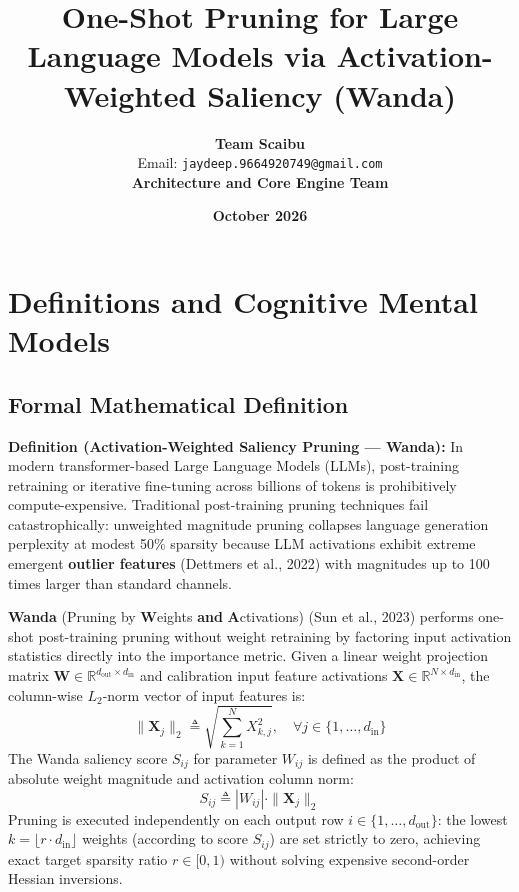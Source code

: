 \documentclass[11pt,a4paper]{article}
\title{\textbf{One-Shot Pruning for Large Language Models via Activation-Weighted Saliency (Wanda)}}
\author{\textbf{Team Scaibu} \\ \small Email: \texttt{jaydeep.9664920749@gmail.com} \\ \small \textbf{Architecture and Core Engine Team}}
\date{\textbf{October 2026}}
\theoremstyle{definition}
\begin{document}
\maketitle

\section{Definitions and Cognitive Mental Models}

\subsection{Formal Mathematical Definition}
\textbf{Definition (Activation-Weighted Saliency Pruning — Wanda):}
In modern transformer-based Large Language Models (LLMs), post-training retraining or iterative fine-tuning across billions of tokens is prohibitively compute-expensive. Traditional post-training pruning techniques fail catastrophically: unweighted magnitude pruning collapses language generation perplexity at modest 50\% sparsity because LLM activations exhibit extreme emergent \textbf{outlier features} (Dettmers et al., 2022) with magnitudes up to 100 times larger than standard channels.

\textbf{Wanda} (Pruning by \textbf{W}eights \textbf{and} \textbf{A}ctivations) (Sun et al., 2023) performs one-shot post-training pruning without weight retraining by factoring input activation statistics directly into the importance metric. Given a linear weight projection matrix $\mathbf{W} \in \mathbb{R}^{d_{\text{out}} \times d_{\text{in}}}$ and calibration input feature activations $\mathbf{X} \in \mathbb{R}^{N \times d_{\text{in}}}$, the column-wise $L_2$-norm vector of input features is:
{\boldmath
\begin{equation}
\|\mathbf{X}_j\|_2 \triangleq \sqrt{\sum_{k=1}^N X_{k, j}^2}, \quad \forall j \in \{1, \dots, d_{\text{in}}\}
\end{equation}
}
The Wanda saliency score $S_{ij}$ for parameter $W_{ij}$ is defined as the product of absolute weight magnitude and activation column norm:
{\boldmath
\begin{equation}
S_{ij} \triangleq |W_{ij}| \cdot \|\mathbf{X}_j\|_2
\end{equation}
}
Pruning is executed independently on each output row $i \in \{1, \dots, d_{\text{out}}\}$: the lowest $k = \lfloor r \cdot d_{\text{in}} \rfloor$ weights (according to score $S_{ij}$) are set strictly to zero, achieving exact target sparsity ratio $r \in [0, 1)$ without solving expensive second-order Hessian inversions.
\end{document}
